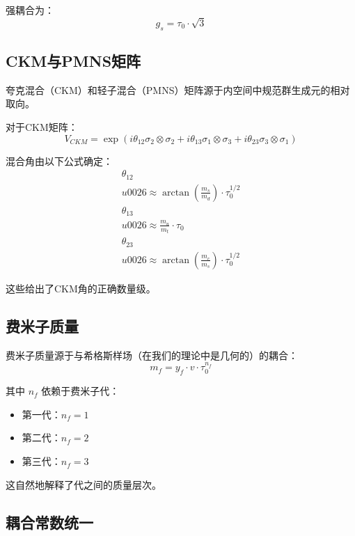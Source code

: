 强耦合为：
\begin{equation}
    g_s = \tau_0 \cdot \sqrt{3}
\end{equation}

\subsection{CKM与PMNS矩阵}

夸克混合（CKM）和轻子混合（PMNS）矩阵源于内空间中规范群生成元的相对取向。

对于CKM矩阵：
\begin{equation}
    V_{CKM} = \exp\left(i \theta_{12} \sigma_2 \otimes \sigma_2 + i \theta_{13} \sigma_1 \otimes \sigma_3 + i \theta_{23} \sigma_3 \otimes \sigma_1\right)
\end{equation}

混合角由以下公式确定：
\begin{align}
    \theta_{12} \\u0026\approx \arctan\left(\frac{m_s}{m_d}\right) \cdot \tau_0^{1/2} \\
    \theta_{13} \\u0026\approx \frac{m_u}{m_t} \cdot \tau_0 \\
    \theta_{23} \\u0026\approx \arctan\left(\frac{m_c}{m_s}\right) \cdot \tau_0^{1/2}
\end{align}

这些给出了CKM角的正确数量级。

\subsection{费米子质量}

费米子质量源于与希格斯样场（在我们的理论中是几何的）的耦合：
\begin{equation}
    m_f = y_f \cdot v \cdot \tau_0^{n_f}
\end{equation}

其中 $n_f$ 依赖于费米子代：
\begin{itemize}
    \item 第一代：$n_f = 1$
    \item 第二代：$n_f = 2$
    \item 第三代：$n_f = 3$
\end{itemize}

这自然地解释了代之间的质量层次。

\subsection{耦合常数统一}

